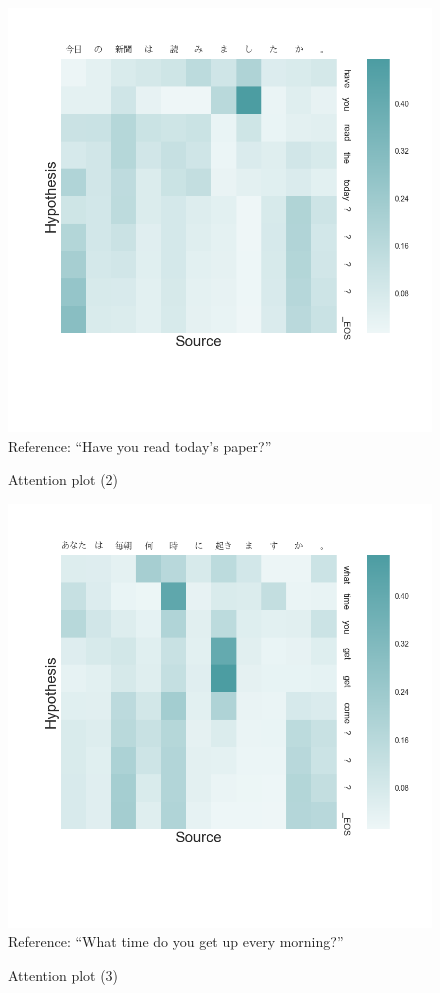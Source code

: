 \documentclass[answers]{exam}
\begin{document}
\begin{CJK}{UTF8}{min}
\begin{figure}
  \centering
  \includegraphics[width=\linewidth]{fig-plot-2}
  Reference: ``Have you read today's paper?''
  \caption{Attention plot (2)}
  \label{fig:plot-2}
\end{figure}

\begin{figure}
  \centering
  \includegraphics[width=\linewidth]{fig-plot-3}
  Reference: ``What time do you get up every morning?''
  \caption{Attention plot (3)}
  \label{fig:plot-3}
\end{figure}


\end{CJK}
\end{document}
